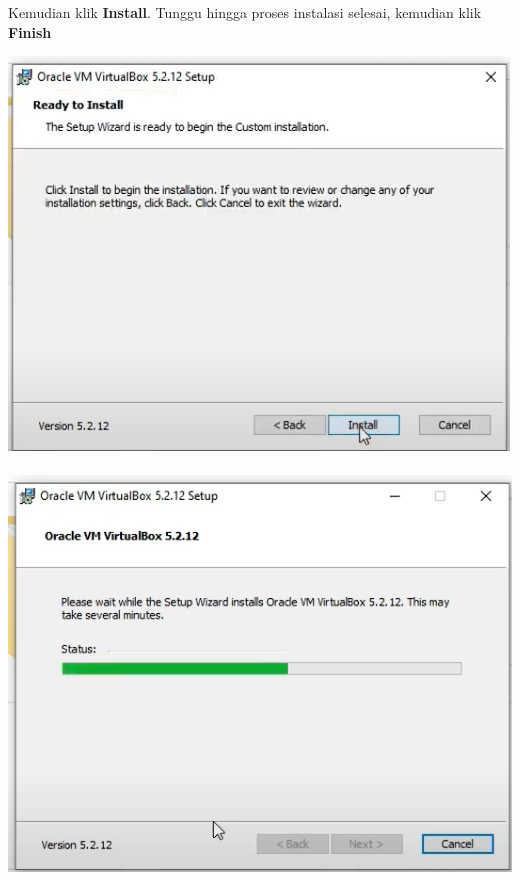 \documentclass{article}
\begin{document}
\begin{flushleft}
\begin{itemize}
        		Kemudian klik \textbf{Install}. Tunggu hingga proses instalasi selesai, kemudian klik \textbf{Finish}
        		
        		\begin{center}
        			\includegraphics[scale=0.7]{Screenshot (256)} \\~\\
        			\includegraphics[scale=0.7]{Screenshot (257)} \\~\\

\end{center}
\end{itemize}
\end{flushleft}
\end{document}
